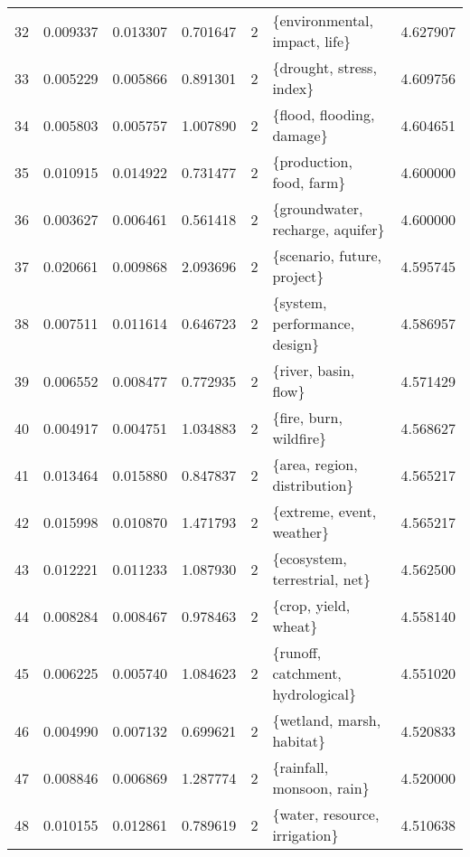 \begin{tabular}{lrrrrlr}
32 &    0.009337 &  0.013307 &        0.701647 &           2 &           \{environmental, impact, life\} &  4.627907 \\
33 &    0.005229 &  0.005866 &        0.891301 &           2 &                \{drought, stress, index\} &  4.609756 \\
34 &    0.005803 &  0.005757 &        1.007890 &           2 &               \{flood, flooding, damage\} &  4.604651 \\
35 &    0.010915 &  0.014922 &        0.731477 &           2 &                \{production, food, farm\} &  4.600000 \\
36 &    0.003627 &  0.006461 &        0.561418 &           2 &        \{groundwater, recharge, aquifer\} &  4.600000 \\
37 &    0.020661 &  0.009868 &        2.093696 &           2 &             \{scenario, future, project\} &  4.595745 \\
38 &    0.007511 &  0.011614 &        0.646723 &           2 &           \{system, performance, design\} &  4.586957 \\
39 &    0.006552 &  0.008477 &        0.772935 &           2 &                    \{river, basin, flow\} &  4.571429 \\
40 &    0.004917 &  0.004751 &        1.034883 &           2 &                  \{fire, burn, wildfire\} &  4.568627 \\
41 &    0.013464 &  0.015880 &        0.847837 &           2 &            \{area, region, distribution\} &  4.565217 \\
42 &    0.015998 &  0.010870 &        1.471793 &           2 &               \{extreme, event, weather\} &  4.565217 \\
43 &    0.012221 &  0.011233 &        1.087930 &           2 &           \{ecosystem, terrestrial, net\} &  4.562500 \\
44 &    0.008284 &  0.008467 &        0.978463 &           2 &                    \{crop, yield, wheat\} &  4.558140 \\
45 &    0.006225 &  0.005740 &        1.084623 &           2 &       \{runoff, catchment, hydrological\} &  4.551020 \\
46 &    0.004990 &  0.007132 &        0.699621 &           2 &               \{wetland, marsh, habitat\} &  4.520833 \\
47 &    0.008846 &  0.006869 &        1.287774 &           2 &               \{rainfall, monsoon, rain\} &  4.520000 \\
48 &    0.010155 &  0.012861 &        0.789619 &           2 &           \{water, resource, irrigation\} &  4.510638 \\

\end{tabular}
